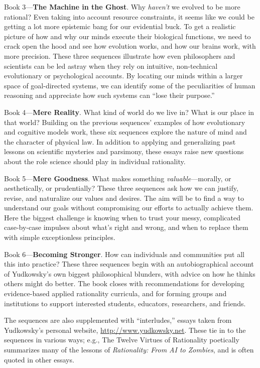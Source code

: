 \documentclass[letterpaper]{book}
\begin{document}
{
 Book 3---\textbf{The Machine in the Ghost}. Why
\textit{haven't} we evolved to be more rational? Even
taking into account resource constraints, it seems like we could be
getting a lot more epistemic bang for our evidential buck. To get a
realistic picture of how and why our minds execute their biological
functions, we need to crack open the hood and see how evolution works,
and how our brains work, with more precision. These three sequences
illustrate how even philosophers and scientists can be led astray when
they rely on intuitive, non-technical evolutionary or psychological
accounts. By locating our minds within a larger space of goal-directed
systems, we can identify some of the peculiarities of human reasoning
and appreciate how such systems can ``lose their
purpose.''}

{
 Book 4---\textbf{Mere Reality}. What kind of world do we live in?
What is our place in that world? Building on the previous
sequences' examples of how evolutionary and cognitive
models work, these six sequences explore the nature of mind and the
character of physical law. In addition to applying and generalizing
past lessons on scientific mysteries and parsimony, these essays raise
new questions about the role science should play in individual
rationality.}

{
 Book 5---\textbf{Mere Goodness}. What makes something
\textit{valuable}{}---morally, or aesthetically, or prudentially? These
three sequences ask how we can justify, revise, and naturalize our
values and desires. The aim will be to find a way to understand our
goals without compromising our efforts to actually achieve them. Here
the biggest challenge is knowing when to trust your messy, complicated
case-by-case impulses about what's right and wrong, and
when to replace them with simple exceptionless principles.}

{
 Book 6---\textbf{Becoming Stronger}. How can individuals and
communities put all this into practice? These three sequences begin
with an autobiographical account of Yudkowsky's own
biggest philosophical blunders, with advice on how he thinks others
might do better. The book closes with recommendations for developing
evidence-based applied rationality curricula, and for forming groups
and institutions to support interested students, educators,
researchers, and friends.}

{
 The sequences are also supplemented with
``interludes,'' essays taken from
Yudkowsky's personal website, \url{http://www.yudkowsky.net}.
These tie in to the sequences in various ways; e.g., The Twelve Virtues
of Rationality poetically summarizes many of the lessons of
\textit{Rationality: From AI to Zombies}, and is often quoted in other
essays.}
\end{document}

